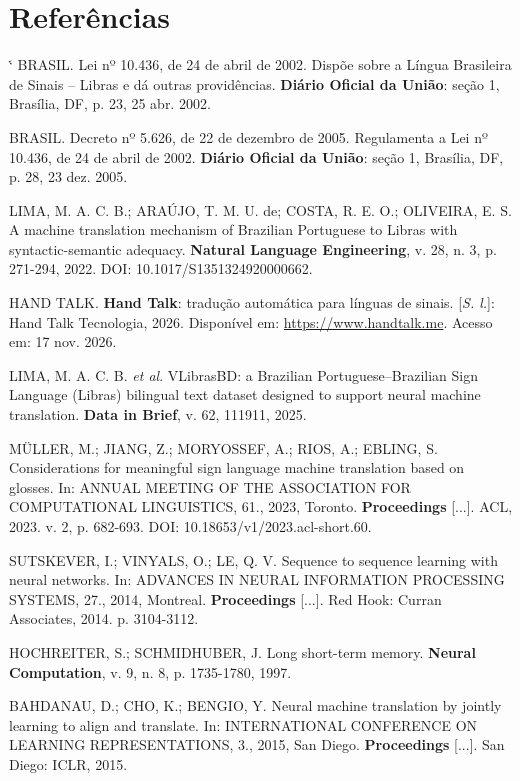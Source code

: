 \documentclass[12pt]{article}
\makeatletter
\renewenvironment{thebibliography}[1]
  {\section*{Referências}\footnotesize
   \list{\@biblabel{\@arabic\c@enumiv}}%
        {\settowidth\labelwidth{\@biblabel{#1}}\leftmargin\labelwidth
         \advance\leftmargin\labelsep\itemsep 3pt\usecounter{enumiv}%
         \let\p@enumiv\@empty\renewcommand\theenumiv{\@arabic\c@enumiv}}%
   \sloppy\clubpenalty4000\widowpenalty4000\sfcode`\.\@m}
  {\endlist}
\makeatother
\begin{document}
\begin{thebibliography}{99}
 BRASIL. Lei nº 10.436, de 24 de abril de 2002. Dispõe sobre a Língua Brasileira de Sinais -- Libras e dá outras providências. \textbf{Diário Oficial da União}: seção 1, Brasília, DF, p. 23, 25 abr. 2002.

 BRASIL. Decreto nº 5.626, de 22 de dezembro de 2005. Regulamenta a Lei nº 10.436, de 24 de abril de 2002. \textbf{Diário Oficial da União}: seção 1, Brasília, DF, p. 28, 23 dez. 2005.

 LIMA, M. A. C. B.; ARAÚJO, T. M. U. de; COSTA, R. E. O.; OLIVEIRA, E. S. A machine translation mechanism of Brazilian Portuguese to Libras with syntactic-semantic adequacy. \textbf{Natural Language Engineering}, v. 28, n. 3, p. 271-294, 2022. DOI: 10.1017/S1351324920000662.

 HAND TALK. \textbf{Hand Talk}: tradução automática para línguas de sinais. [\emph{S. l.}]: Hand Talk Tecnologia, 2026. Disponível em: \url{https://www.handtalk.me}. Acesso em: 17 nov. 2026.

 LIMA, M. A. C. B. \emph{et al}. VLibrasBD: a Brazilian Portuguese--Brazilian Sign Language (Libras) bilingual text dataset designed to support neural machine translation. \textbf{Data in Brief}, v. 62, 111911, 2025.

 MÜLLER, M.; JIANG, Z.; MORYOSSEF, A.; RIOS, A.; EBLING, S. Considerations for meaningful sign language machine translation based on glosses. In: ANNUAL MEETING OF THE ASSOCIATION FOR COMPUTATIONAL LINGUISTICS, 61., 2023, Toronto. \textbf{Proceedings} [...]. ACL, 2023. v. 2, p. 682-693. DOI: 10.18653/v1/2023.acl-short.60.

 SUTSKEVER, I.; VINYALS, O.; LE, Q. V. Sequence to sequence learning with neural networks. In: ADVANCES IN NEURAL INFORMATION PROCESSING SYSTEMS, 27., 2014, Montreal. \textbf{Proceedings} [...]. Red Hook: Curran Associates, 2014. p. 3104-3112.

 HOCHREITER, S.; SCHMIDHUBER, J. Long short-term memory. \textbf{Neural Computation}, v. 9, n. 8, p. 1735-1780, 1997.

 BAHDANAU, D.; CHO, K.; BENGIO, Y. Neural machine translation by jointly learning to align and translate. In: INTERNATIONAL CONFERENCE ON LEARNING REPRESENTATIONS, 3., 2015, San Diego. \textbf{Proceedings} [...]. San Diego: ICLR, 2015.


\end{thebibliography}
\end{document}
